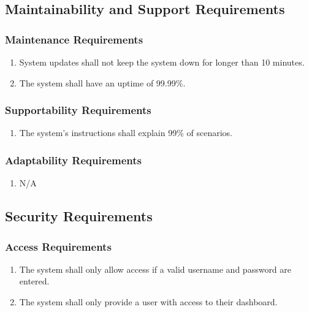 \documentclass[]{article}
\begin{document}
	
	\subsection{Maintainability and Support Requirements}
	\label{sub:maintainability_and_support_requirements}
	
	\subsubsection{Maintenance Requirements}
	\label{ssub:maintenance_requirements}
	\begin{enumerate}[{MS}1. ]
		\item System updates shall not keep the system down for longer than 10 minutes.
		\item The system shall have an uptime of 99.99\%.
	\end{enumerate}
	
	\subsubsection{Supportability Requirements}
	\label{ssub:supportability_requirements}
	\begin{enumerate}[{MS}1. ]
		\item The system's instructions shall explain 99\% of scenarios.
	\end{enumerate}
	
	\subsubsection{Adaptability Requirements}
	\label{ssub:adaptability_requirements}
	\begin{enumerate}[{MS}1. ]
		\item N/A
	\end{enumerate}
	
	\subsection{Security Requirements}
	\label{sub:security_requirements}
	
	\subsubsection{Access Requirements}
	\label{ssub:access_requirements}
	\begin{enumerate}[{SR}1. ]
		\item The system shall only allow access if a valid username and password are entered.
		\item The system shall only provide a user with access to their dashboard.
	\end{enumerate}
	
\end{document}
